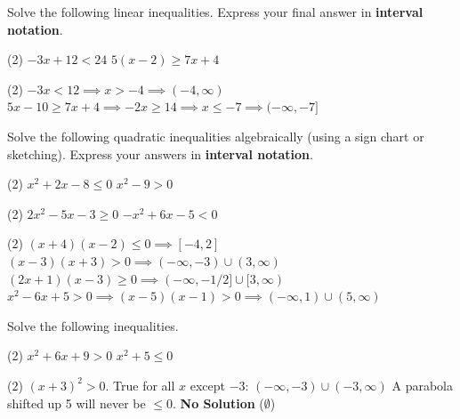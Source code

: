 \documentclass[12pt]{exam}
\begin{document}
\begin{questions}
\question Solve the following linear inequalities. Express your final answer in \textbf{interval notation}.
\begin{tasks}(2)
    \task $-3x + 12 < 24$
    \task $5(x - 2) \geq 7x + 4$
\end{tasks}
\begin{solution}
\begin{tasks}(2)
    \task $-3x < 12 \implies x > -4 \implies (-4, \infty)$
    \task $5x - 10 \geq 7x + 4 \implies -2x \geq 14 \implies x \leq -7 \implies (-\infty, -7]$
\end{tasks}
\end{solution}

\pagebreak

\question Solve the following quadratic inequalities algebraically (using a sign chart or sketching). Express your answers in \textbf{interval notation}.
\begin{tasks}(2)
    \task $x^2 + 2x - 8 \leq 0$
    \task $x^2 - 9 > 0$
    \end{tasks}
    \begin{tasks}[resume](2)
    \task $2x^2 - 5x - 3 \geq 0$
    \task $-x^2 + 6x - 5 < 0$
\end{tasks}
\begin{solution}
\begin{tasks}(2)
    \task $(x+4)(x-2) \leq 0 \implies [-4, 2]$
    \task $(x-3)(x+3) > 0 \implies (-\infty, -3) \cup (3, \infty)$
    \task $(2x+1)(x-3) \geq 0 \implies (-\infty, -1/2] \cup [3, \infty)$
    \task $x^2 - 6x + 5 > 0 \implies (x-5)(x-1) > 0 \implies (-\infty, 1) \cup (5, \infty)$
\end{tasks}
\end{solution}

\question Solve the following inequalities.
\begin{tasks}(2)
    \task $x^2 + 6x + 9 > 0$
    \task $x^2 + 5 \leq 0$
\end{tasks}
\begin{solution}
\begin{tasks}(2)
    \task $(x+3)^2 > 0$. True for all $x$ except $-3$: $(-\infty, -3) \cup (-3, \infty)$
    \task A parabola shifted up 5 will never be $\leq 0$. \textbf{No Solution} ($\emptyset$)
\end{tasks}
\end{solution}
\end{questions}
\end{document}
